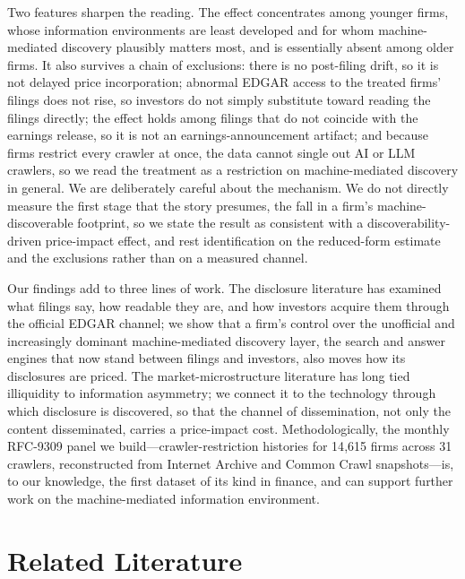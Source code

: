 \documentclass[12pt]{article}
\begin{document}
Two features sharpen the reading. The effect concentrates among younger firms, whose information environments are least developed and for whom machine-mediated discovery plausibly matters most, and is essentially absent among older firms. It also survives a chain of exclusions: there is no post-filing drift, so it is not delayed price incorporation; abnormal EDGAR access to the treated firms' filings does not rise, so investors do not simply substitute toward reading the filings directly; the effect holds among filings that do not coincide with the earnings release, so it is not an earnings-announcement artifact; and because firms restrict every crawler at once, the data cannot single out AI or LLM crawlers, so we read the treatment as a restriction on machine-mediated discovery in general. We are deliberately careful about the mechanism. We do not directly measure the first stage that the story presumes, the fall in a firm's machine-discoverable footprint, so we state the result as consistent with a discoverability-driven price-impact effect, and rest identification on the reduced-form estimate and the exclusions rather than on a measured channel.

Our findings add to three lines of work. The disclosure literature has examined what filings say, how readable they are, and how investors acquire them through the official EDGAR channel; we show that a firm's control over the unofficial and increasingly dominant machine-mediated discovery layer, the search and answer engines that now stand between filings and investors, also moves how its disclosures are priced. The market-microstructure literature has long tied illiquidity to information asymmetry; we connect it to the technology through which disclosure is discovered, so that the channel of dissemination, not only the content disseminated, carries a price-impact cost. Methodologically, the monthly RFC-9309 panel we build---crawler-restriction histories for 14{,}615 firms across 31 crawlers, reconstructed from Internet Archive and Common Crawl snapshots---is, to our knowledge, the first dataset of its kind in finance, and can support further work on the machine-mediated information environment.

\section{Related Literature}\label{sec:lit}
\end{document}

